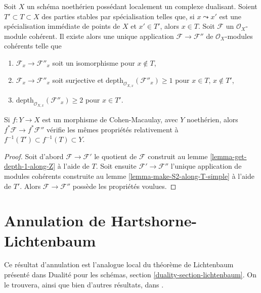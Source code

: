 \begin{lemma}
\label{lemma-make-S2-along-T}
Soit $X$ un schéma noethérien possédant localement un complexe dualisant. Soient $T' \subset T \subset X$ des parties stables par spécialisation telles que, si $x \leadsto x'$ est une spécialisation immédiate de points de $X$ et $x' \in T'$, alors $x \in T$. Soit $\mathcal{F}$ un $\mathcal{O}_X$-module cohérent. Il existe alors une unique application $\mathcal{F} \to \mathcal{F}''$ de $\mathcal{O}_X$-modules cohérents telle que
\begin{enumerate}
\item $\mathcal{F}_x \to \mathcal{F}''_x$ soit un isomorphisme pour $x \not \in T$,
\item $\mathcal{F}_x \to \mathcal{F}''_x$ soit surjective et $\text{depth}_{\mathcal{O}_{X, x}}(\mathcal{F}''_x) \geq 1$ pour $x \in T$, $x \not \in T'$,
\item $\text{depth}_{\mathcal{O}_{X, x}}(\mathcal{F}''_x) \geq 2$ pour $x \in T'$.
\end{enumerate}
Si $f : Y \to X$ est un morphisme de Cohen-Macaulay, avec $Y$ noethérien, alors $f^*\mathcal{F} \to f^*\mathcal{F}''$ vérifie les mêmes propriétés relativement à $f^{-1}(T') \subset f^{-1}(T) \subset Y$.
\end{lemma}

\begin{proof}
Soit d'abord $\mathcal{F} \to \mathcal{F}'$ le quotient de $\mathcal{F}$ construit au lemme \ref{lemma-get-depth-1-along-Z} à l'aide de $T$. Soit ensuite $\mathcal{F}' \to \mathcal{F}''$ l'unique application de modules cohérents construite au lemme \ref{lemma-make-S2-along-T-simple} à l'aide de $T'$. Alors $\mathcal{F} \to \mathcal{F}''$ possède les propriétés voulues.
\end{proof}










\section{Annulation de Hartshorne-Lichtenbaum}
\label{section-Hartshorne-Lichtenbaum-vanishing}

\noindent
Ce résultat d'annulation est l'analogue local du théorème de Lichtenbaum présenté dans Dualité pour les schémas, section \ref{duality-section-lichtenbaum}. On le trouvera, ainsi que bien d'autres résultats, dans \cite{CD}.

